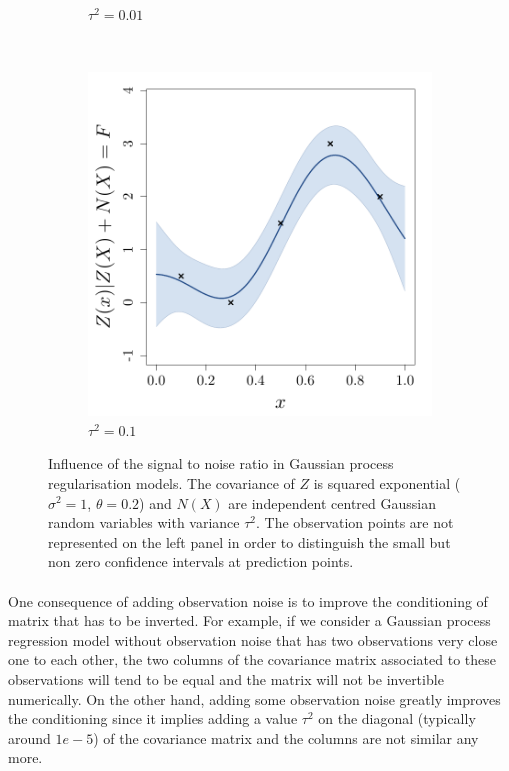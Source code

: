 \documentclass[twoside,openright]{report}
\begin{document}
\begin{figure}
\begin{subfigure}[t]{0.3\textwidth}
                \caption{$\tau^2 = 0.01$}
        \end{subfigure}%
        ~ 
        \begin{subfigure}[t]{0.3\textwidth}
                \includegraphics[width=\textwidth]{figures/ch2_GPRnoise01}
                \caption{$\tau^2 = 0.1$}
        \end{subfigure}%
        \caption{Influence of the signal to noise ratio in Gaussian process regularisation models. The covariance of $Z$ is squared exponential ($\sigma^2=1$, $\theta=0.2$) and $N(X)$ are independent centred Gaussian random variables with variance $\tau^2$. The observation points are not represented on the left panel in order to distinguish the small but non zero confidence intervals at prediction points.}
        \label{fig:GPRnoise}
\end{figure}

\paragraph{}
One consequence of adding observation noise is to improve the conditioning of matrix that has to be inverted. For example, if we consider a Gaussian process regression model without observation noise that has two observations very close one to each other, the two columns of the covariance matrix associated to these observations will tend to be equal and the matrix will not be invertible numerically. On the other hand, adding some observation noise greatly improves the conditioning since it implies adding a value $\tau^2$ on the diagonal (typically around $1e-5$) of the covariance matrix and the columns are not similar any more. 
\end{document}
